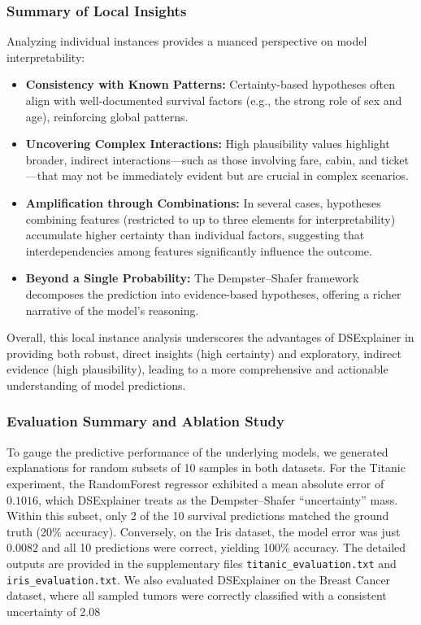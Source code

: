 \documentclass[acmlarge]{acmart}
\begin{document}
\subsubsection{Summary of Local Insights}

Analyzing individual instances provides a nuanced perspective on model interpretability:
\begin{itemize}
    \item \textbf{Consistency with Known Patterns:} Certainty-based hypotheses often align with well-documented survival factors (e.g., the strong role of sex and age), reinforcing global patterns.
    \item \textbf{Uncovering Complex Interactions:} High plausibility values highlight broader, indirect interactions—such as those involving fare, cabin, and ticket—that may not be immediately evident but are crucial in complex scenarios.
    \item \textbf{Amplification through Combinations:} In several cases, hypotheses combining features (restricted to up to three elements for interpretability) accumulate higher certainty than individual factors, suggesting that interdependencies among features significantly influence the outcome.
    \item \textbf{Beyond a Single Probability:} The Dempster–Shafer framework decomposes the prediction into evidence-based hypotheses, offering a richer narrative of the model’s reasoning.
\end{itemize}

Overall, this local instance analysis underscores the advantages of DSExplainer in providing both robust, direct insights (high certainty) and exploratory, indirect evidence (high plausibility), leading to a more comprehensive and actionable understanding of model predictions.
\subsubsection{Evaluation Summary and Ablation Study}
\label{sec:validation}

To gauge the predictive performance of the underlying models, we generated explanations for random subsets of 10 samples in both datasets. For the Titanic experiment, the RandomForest regressor exhibited a mean absolute error of $0.1016$, which DSExplainer treats as the Dempster--Shafer ``uncertainty'' mass. Within this subset, only 2 of the 10 survival predictions matched the ground truth (20\% accuracy). Conversely, on the Iris dataset, the model error was just $0.0082$ and all 10 predictions were correct, yielding 100\% accuracy. The detailed outputs are provided in the supplementary files \texttt{titanic\_evaluation.txt} and \texttt{iris\_evaluation.txt}.
We also evaluated DSExplainer on the Breast Cancer dataset, where all sampled tumors were correctly classified with a consistent uncertainty of 2.08%
\end{document}
